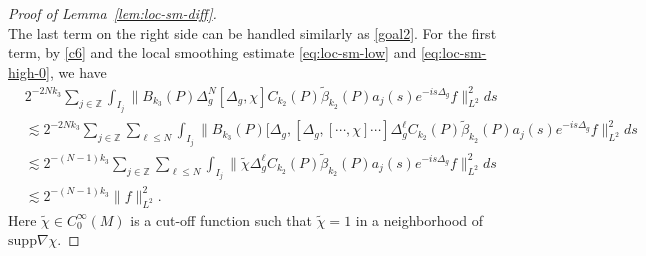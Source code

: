 \documentclass[10pt]{amsart}
\newcommand{\la}{\lambda}
\newcommand{\supp}{\mathrm{supp }}
\newcommand{\1}{{\bf 1}}
\begin{document}
\begin{proof}[Proof of Lemma~\ref{lem:loc-sm-diff}]
\begin{equation*}
\end{equation*}
The last term on the right side can be handled similarly as \eqref{goal2}. For the first term, by \eqref{c6} and the local smoothing estimate \eqref{eq:loc-sm-low} and \eqref{eq:loc-sm-high-0}, we have
\begin{equation}\label{goal2c}
    \begin{split}
    &2^{-2Nk_3}\sum_{j\in \mathbb{Z}} \int_{I_j}\|B_{k_3}(P)\Delta_g^{N}[\Delta_g, \chi] C_{k_2} (P)\tilde\beta_{k_2}(P) a_j(s)  e^{-is\Delta_g} f\|_{L^2}^2 ds \\
    &\lesssim 2^{-2Nk_3}\sum_{j\in \mathbb{Z}} \sum_{\ell\leq N}\int_{I_j} \| B_{k_3}(P)[\Delta_g,[\Delta_g,[\cdots,\chi]\cdots]\Delta_g^{\ell} C_{k_2} (P) \tilde\beta_{k_2}(P) a_j(s)  e^{-is\Delta_g} f\|_{L^2}^2 ds\\
    &\lesssim 2^{-(N-1)k_3}\sum_{j\in \mathbb{Z}}\sum_{\ell\leq N} \int_{I_j} \|\tilde \chi\Delta_g^{\ell} C_{k_2} (P)\tilde\beta_{k_2}(P) a_j(s) e^{-is\Delta_g} f\|_{L^2}^2 ds\\
    &\lesssim 2^{-(N-1)k_3}\|f\|_{L^2}^2.
    \end{split}
\end{equation}
Here $\tilde \chi\in C_0^\infty(M)$ is a cut-off function such that $\tilde\chi=1$ in a neighborhood of $\supp \nabla\chi$. 



\end{proof}
\end{document}
